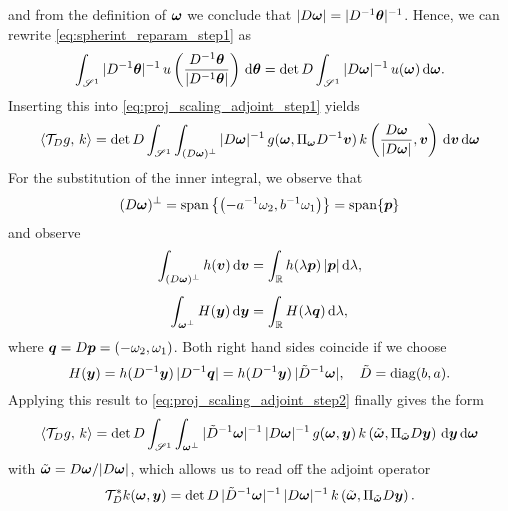 \documentclass{amsart}
\newcommand*{\Dinv}{{\ensuremath{D^{-1}}}}
\begin{document}
%
and from the definition of ${\boldsymbol{\omega}}$ we conclude that $\ABS{D \Bomega} = \ABS{\Dinv \Btheta}^{-1}$. Hence, we can rewrite 
\eqref{eq:spherint_reparam_step1} as
%
\begin{equation}
 \label{eq:spherint_reparam}
 \int_{\SPHERE^1} \ABS{\Dinv \Btheta}^{-1}\, u\left(\frac{\Dinv\Btheta}{\ABS{\Dinv\Btheta}}\right)\, \D \Btheta = 
 \det D \int_{\SPHERE^1} \ABS{D \Bomega}^{-1}\, u(\Bomega)\, \D\Bomega.
\end{equation} 
%
Inserting this into \eqref{eq:proj_scaling_adjoint_step1} yields
%
\begin{equation}
 \label{eq:proj_scaling_adjoint_step2}
 \INNER{\OPT_D g}{k} = \det D \int_{\SPHERE^1} \int_{(D\Bomega)^\perp} \ABS{D \Bomega}^{-1}\, g(\Bomega, \Pi_\Bomega \Dinv\Bv)\, 
 k\left(\frac{D \Bomega}{\ABS{D \Bomega}}, \Bv\right)\, \D\Bv\, \D\Bomega
\end{equation} 
%
For the substitution of the inner integral, we observe that
%
\begin{equation*}
 (D{\boldsymbol{\omega}})^\perp = \operatorname*{span}\left\lbrace \left(-a^{-1}\omega_2, b^{-1}\omega_1\right) \right\rbrace = \operatorname*{span}\lbrace {\boldsymbol{p}} \rbrace
\end{equation*}
%
and observe
%
\begin{align*}
 \int_{(D{\boldsymbol{\omega}})^\perp} h({\boldsymbol{v}})\, \mathrm{d} {\boldsymbol{v}} 
 &= \int_{\mathbb{R}} h(\lambda {\boldsymbol{p}})\, |{\boldsymbol{p}}|\, \mathrm{d}\lambda,\\[1ex]
 \int_{{\boldsymbol{\omega}}^\perp} H({\boldsymbol{y}})\, \mathrm{d} {\boldsymbol{y}}
 &= \int_{\mathbb{R}} H(\lambda {\boldsymbol{q}})\, \mathrm{d}\lambda,
\end{align*}
%
where ${\boldsymbol{q}} = D{\boldsymbol{p}} = (-\omega_2, \omega_1)$. Both right hand sides coincide if we choose 
%
\begin{equation*}
 H(\By) = h(\Dinv \By)\, \ABS{\Dinv \Bq} = h(\Dinv \By)\, \ABS{\tilde D^{-1} \Bomega},\quad \tilde D = \DIAG(b,a).
\end{equation*}
%
Applying this result to \eqref{eq:proj_scaling_adjoint_step2} finally gives the form
%
\begin{equation}
 \label{eq:proj_scaling_adjoint_final}
 \langle {\ensuremath{\mathcal{T}}}_D g,\,k\rangle = \det D \int_{\mathscr{S}^1} \int_{{\boldsymbol{\omega}}^\perp} |\tilde D^{-1} {\boldsymbol{\omega}}|^{-1}\, |D {\boldsymbol{\omega}}|^{-1}\, 
 g({\boldsymbol{\omega}}, {\boldsymbol{y}})\, k\left(\tilde{{\boldsymbol{\omega}}}, \Pi_{\tilde{{\boldsymbol{\omega}}}} D {\boldsymbol{y}}\right)\, \mathrm{d}{\boldsymbol{y}}\, \mathrm{d}{\boldsymbol{\omega}}
\end{equation} 
%
with $\tilde{{\boldsymbol{\omega}}} = {D {\boldsymbol{\omega}}}/{|D {\boldsymbol{\omega}}|}$, which allows us to read off the adjoint operator
%
\begin{equation}
 \label{eq:proj_scaling_adjoint}
 {\ensuremath{\mathcal{T}}}_D^* k({\boldsymbol{\omega}}, {\boldsymbol{y}}) = \det D\, |\tilde D^{-1} {\boldsymbol{\omega}}|^{-1}\, |D {\boldsymbol{\omega}}|^{-1}\, 
 k\left(\tilde{{\boldsymbol{\omega}}}, \Pi_{\tilde{{\boldsymbol{\omega}}}} D {\boldsymbol{y}}\right).
\end{equation}
\end{document}

